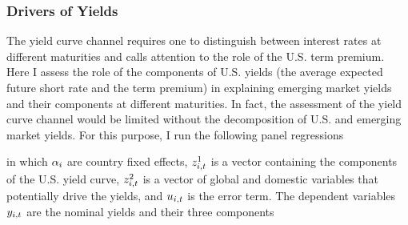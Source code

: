 {\subsubsection{Drivers of Yields}
The yield curve channel requires one to distinguish between interest rates at different maturities and calls attention to the role of the U.S. term premium.
Here I assess the role of the components of U.S. yields (the average expected future short rate and the term premium)
in explaining emerging market yields and their components at different maturities.
In fact, the assessment of the yield curve channel would be limited without the decomposition of U.S. and emerging market yields.
For this purpose, I run the following panel regressions 

\noindent in which \(\alpha_{i}\) are country fixed effects, \(z^{1}_{i,t}\) is a vector containing the components of the U.S. yield curve, \(z^{2}_{i,t}\) is a vector of global and domestic variables that potentially drive the yields, and \(u_{i,t}\) is the error term. 
The dependent variables \(y_{i,t}\) are the nominal yields and their three components 
}
